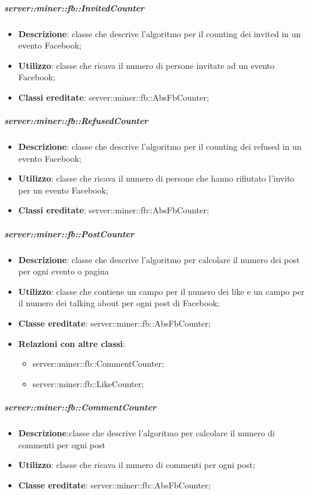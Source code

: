 	\subparagraph{server::miner::fb::InvitedCounter} %
		\label{subp:server_miner_fb_InvitedCunter}
			\begin{itemize}
				\item \textbf{Descrizione}: classe che descrive l'algoritmo per il counting dei invited in un evento Facebook;
				\item \textbf{Utilizzo}: classe che ricava il numero di persone invitate ad un evento Facebook;
				\item \textbf{Classi ereditate}: server::miner::fb::AbsFbCounter;
			\end{itemize}

	\subparagraph{server::miner::fb::RefusedCounter} %
		\label{subp:server_miner_fb_RefusedCounter}
			\begin{itemize}
				\item \textbf{Descrizione}: classe che descrive l'algoritmo per il counting dei refused in un evento Facebook;
				\item \textbf{Utilizzo}: classe che ricava il numero di persone che hanno rifiutato l'invito per un evento Facebook;
				\item \textbf{Classi ereditate}: server::miner::fb::AbsFbCounter;
			\end{itemize}

	\subparagraph{server::miner::fb::PostCounter} %
		\label{subp:server_miner_fb_PostCounter}
			\begin{itemize}
				\item \textbf{Descrizione}: classe che descrive l'algoritmo per calcolare il numero dei post per ogni evento o pagina
				\item \textbf{Utilizzo}: classe che contiene un campo per il numero dei like e un campo per il numero dei talking about per ogni post di Facebook;
				\item \textbf{Classe ereditate}: server::miner::fb::AbsFbCounter;
				\item \textbf{Relazioni con altre classi}:
					\begin{itemize}
						\item server::miner::fb::CommentCounter;
						\item server::miner::fb::LikeCounter;
					\end{itemize}
			\end{itemize}

	\subparagraph{server::miner::fb::CommentCounter} %
		\label{subp:server_miner_fb_CommentCounter}
			\begin{itemize}
				\item \textbf{Descrizione}:classe che descrive l'algoritmo per calcolare il numero di commenti per ogni post
				\item \textbf{Utilizzo}: classe che ricava il numero di commenti per ogni post;
				\item \textbf{Classe ereditate}: server::miner::fb::AbsFbCounter;
			\end{itemize}

